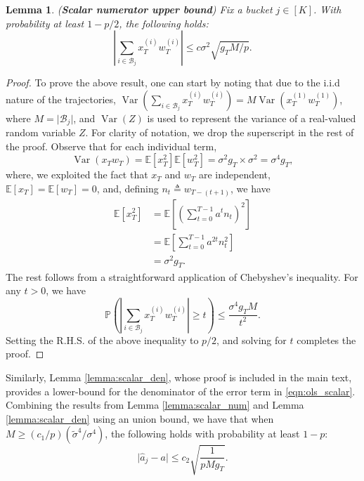 \documentclass[letterpaper, 11 pt]{article}
\newcommand{\mc}{\mathcal}
\newcommand{\abs}[1]{\lvert #1 \rvert}
\newcommand{\abslr}[1]{\left\lvert#1\right\rvert}
\DeclareMathOperator{\Var}{Var}
\newtheorem{lemma}{Lemma}
\begin{document}
\begin{lemma} (\textbf{Scalar numerator upper bound})  Fix a bucket $j \in [K]$. With probability at least $1 - p/2$, the following holds:
$$\abslr{\sum_{i \in \mc{B}_j} x_T^{(i)}w_T^{(i)}} \leq c\sigma^2\sqrt{g_T M/p}.$$ 
\end{lemma}
\begin{proof}
To prove the above result, one can start by noting that due to the i.i.d nature of the trajectories, $\Var(\sum_{i \in \mc{B}_j} x_T^{(i)}w_T^{(i)}) = M \Var(x_T^{(1)}w_T^{(1)})$, where $M = \abs{\mc{B}_j}$, and $\Var(Z)$ is used to represent the variance of a real-valued random variable $Z$. For clarity of notation, we drop the superscript in the rest of the proof. Observe that for each individual term,
\begin{equation}
    \Var(x_Tw_T) = \mathbb{E}[x_T^2] \mathbb{E}[w_T^2] = \sigma^2 g_T \times \sigma^2 = \sigma^4 g_T,
\end{equation} 
where, we exploited the fact that $x_T$ and $w_T$ are independent, $\mathbb{E}[x_T] = \mathbb{E}[w_T]=0$, and, defining $n_t \triangleq w_{T - (t+1)}$, we have
\begin{equation*}
\begin{aligned}
    \mathbb{E}[x_T^2] &= \mathbb{E}\left[\left(\sum_{t = 0}^{T-1} a^tn_t\right)^2\right] \\
    &= \mathbb{E}\left[\sum_{t = 0}^{T-1} a^{2t}n_t^2\right] \\
    &= \sigma^2 g_T.
\end{aligned}
\end{equation*}
The rest follows from a straightforward application of Chebyshev's inequality. For any $t >0$, we have
\begin{equation*}
    \mathbb{P}\left(\abslr{\sum_{i \in \mc{B}_j} x_T^{(i)}w_T^{(i)}} \geq t \right) \leq \frac{\sigma^4 g_T M}{t^2}.
\end{equation*}
Setting the R.H.S. of the above inequality to $p/2$, and solving for $t$ completes the proof.
\end{proof}

Similarly, Lemma \ref{lemma:scalar_den}, whose proof is included in the main text, provides a lower-bound for the denominator of the error term in \eqref{eqn:ols_scalar}. Combining the results from Lemma \ref{lemma:scalar_num} and Lemma \ref{lemma:scalar_den} using an union bound, we have that when $M \geq (c_1/p) (\tilde{\sigma}^4/\sigma^4)$, the following holds with probability at least $1 - p$:
\begin{equation}
    \abs{\hat{a}_j - a} \leq c_2\sqrt{\frac{1}{p M g_T}}.
    \label{eqn:scalar_bound_pre_boost_appendix}
\end{equation}
\end{document}

